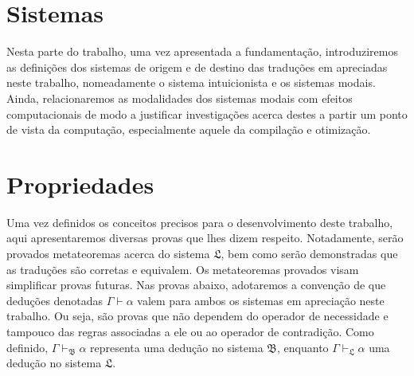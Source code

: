     \tableofcontents

    
    
    

    \chapter{Sistemas}

        Nesta parte do trabalho, uma vez apresentada a fundamentação, introduziremos as definições dos sistemas de origem e de destino das traduções em apreciadas neste trabalho, nomeadamente o sistema intuicionista e os sistemas modais.
        Ainda, relacionaremos as modalidades dos sistemas modais com efeitos computacionais de modo a justificar investigações acerca destes a partir um ponto de vista da computação, especialmente aquele da compilação e otimização.

        
        
        
        

    \chapter{Propriedades}
        Uma vez definidos os conceitos precisos para o desenvolvimento deste trabalho, aqui apresentaremos diversas provas que lhes dizem respeito.
        Notadamente, serão provados metateoremas acerca do sistema $\mathfrak{L}$, bem como serão demonstradas que as traduções são corretas e equivalem.
        Os metateoremas provados visam simplificar provas futuras.
        Nas provas abaixo, adotaremos a convenção de que deduções denotadas $\Gamma\vdash\alpha$ valem para ambos os sistemas em apreciação neste trabalho.
        Ou seja, são provas que não dependem do operador de necessidade e tampouco das regras associadas a ele ou ao operador de contradição.
        Como definido, $\Gamma\vdash_\mathfrak{B}\alpha$ representa uma dedução no sistema $\mathfrak{B}$, enquanto $\Gamma\vdash_\mathfrak{L}\alpha$ uma dedução no sistema $\mathfrak{L}$.

        
        
        
        
        

    
    

